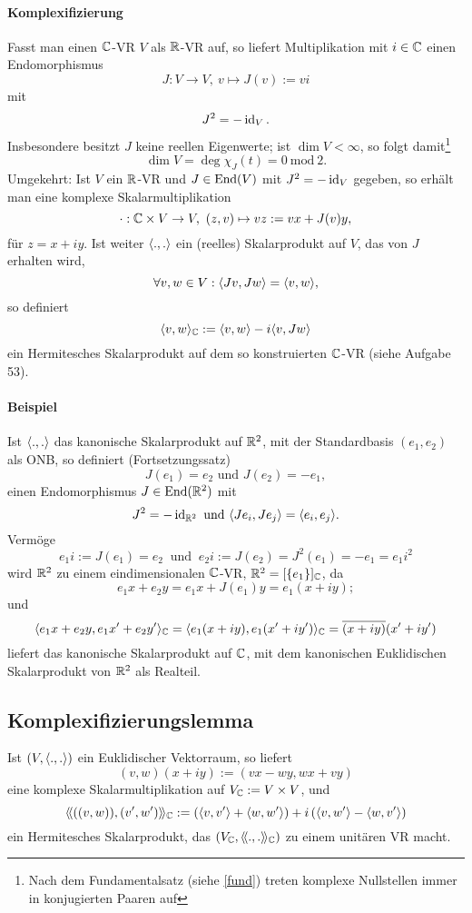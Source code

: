 \paragraph{Komplexifizierung}
	Fasst man einen $ \mathbb{C} $-VR $ V $ als $ \mathbb{R} $-VR auf, so liefert Multiplikation mit $ i\in \mathbb{C} $ einen Endomorphismus
		\[ J:V\to V,\ v\mapsto J(v):= vi \] %
	mit
		\[ J^2 = -\operatorname{id}_V. \]
	Insbesondere besitzt $ J $ keine reellen Eigenwerte;
	ist $ \dim V < \infty $, so folgt damit\footnote{Nach dem Fundamentalsatz (siehe \ref{fund}) treten komplexe Nullstellen immer in konjugierten Paaren auf}
		\[ \dim V = \deg{\chi_J}(t) = 0\ \text{mod}\ 2. \]
	Umgekehrt: Ist $ V $ ein $ \mathbb{R} $-VR und $ J\in \operatorname{End}(V) $ mit $ J^2 = -\operatorname{id}_V $ gegeben, so erhält man eine komplexe Skalarmultiplikation
		\[ \cdot :\mathbb{C}\times V \to V,\ (z,v)\mapsto vz := vx+J(v)y, \]
	für $ z = x+iy $.
	Ist weiter $ \langle .,. \rangle $ ein (reelles) Skalarprodukt auf $ V $, das von $ J $ erhalten wird, 
		\[ \forall v,w\in V: \langle Jv,Jw \rangle = \langle v,w \rangle, \]
	so definiert
		\[ \langle v,w \rangle_{\mathbb{C}} := \langle v,w \rangle -i \langle v,Jw \rangle \]
	ein Hermitesches Skalarprodukt auf dem so konstruierten $ \mathbb{C} $-VR (siehe Aufgabe 53).

\paragraph{Beispiel}\label{JDrehung}
	Ist $ \langle .,. \rangle $ das kanonische Skalarprodukt auf $ \mathbb{R}^2 $, mit der Standardbasis $ (e_1,e_2) $ als ONB, so definiert (Fortsetzungssatz)
		\[ J(e_1) = e_2 \text{ und } J(e_2) = -e_1, \]
	einen Endomorphismus $ J\in\operatorname{End}(\mathbb{R}^2) $ mit
		\[ J^2 = -\operatorname{id}_{\mathbb{R}^2} \text{ und } \langle Je_i,Je_j \rangle = \langle e_i,e_j \rangle. \]
	Vermöge
		\[ e_1i := J(e_1) = e_2\ \text{ und }\ e_2i := J(e_2) = J^2(e_1) = -e_1 = e_1 i^2 \]
	wird $ \mathbb{R}^2 $ zu einem eindimensionalen $ \mathbb{C} $-VR, $ \mathbb{R}^2 = [\{e_1\}]_{\mathbb{C}} $, da
		\[ e_1x+e_2y = e_1x+J(e_1)y = e_1 (x+iy); \]
	und
		\[ \langle e_1x+e_2y,e_1x'+e_2y' \rangle_{\mathbb{C}} = \langle e_1(x+iy),e_1(x'+iy') \rangle_{\mathbb{C}} = \overline{(x+iy)}(x'+iy') \]
	liefert das kanonische Skalarprodukt auf $ \mathbb{C} $, mit dem kanonischen Euklidischen Skalarprodukt von $ \mathbb{R}^2 $ als Realteil.

\subsection{Komplexifizierungslemma}
\begin{Lemma}[Komplexifizierungslemma]
	Ist $ (V,\langle .,. \rangle) $ ein Euklidischer Vektorraum, so liefert
		\[ (v,w)(x+iy) := (vx-wy,wx+vy) \]
	eine komplexe Skalarmultiplikation auf $ V_{\mathbb{C}} := V\times V $, und
		\[ \langle\! \langle ((v,w)),(v',w') \rangle\! \rangle_{\mathbb{C}} := \left(\langle v,v' \rangle+\langle w,w' \rangle \right)+i\left(\langle v,w' \rangle-\langle w,v' \rangle \right) \]
	ein Hermitesches Skalarprodukt, das $ (V_{\mathbb{C}},\langle\! \langle .,. \rangle\! \rangle_{\mathbb{C}}) $ zu einem unitären VR macht.
\end{Lemma}

